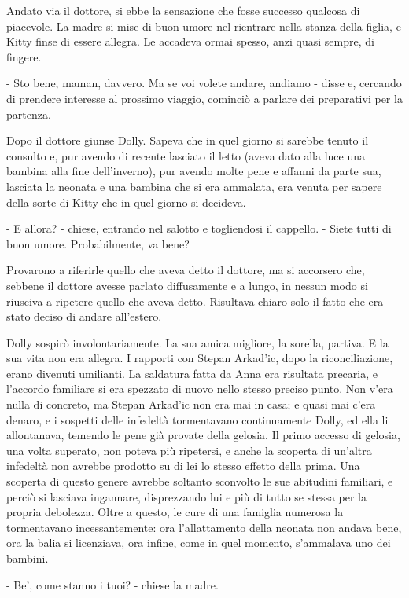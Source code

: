 Andato via il dottore, si ebbe la sensazione che fosse successo qualcosa di piacevole. La madre si mise di buon umore nel rientrare nella stanza della figlia, e Kitty finse di essere allegra. Le accadeva ormai spesso, anzi quasi sempre, di fingere. 

- Sto bene, maman, davvero. Ma se voi volete andare, andiamo - disse e, cercando di prendere interesse al prossimo viaggio, cominciò a parlare dei preparativi per la partenza. 

Dopo il dottore giunse Dolly. Sapeva che in quel giorno si sarebbe tenuto il consulto e, pur avendo di recente lasciato il letto (aveva dato alla luce una bambina alla fine dell'inverno), pur avendo molte pene e affanni da parte sua, lasciata la neonata e una bambina che si era ammalata, era venuta per sapere della sorte di Kitty che in quel giorno si decideva. 

- E allora? - chiese, entrando nel salotto e togliendosi il cappello. - Siete tutti di buon umore. Probabilmente, va bene? 

Provarono a riferirle quello che aveva detto il dottore, ma si accorsero che, sebbene il dottore avesse parlato diffusamente e a lungo, in nessun modo si riusciva a ripetere quello che aveva detto. Risultava chiaro solo il fatto che era stato deciso di andare all'estero. 

Dolly sospirò involontariamente. La sua amica migliore, la sorella, partiva. E la sua vita non era allegra. I rapporti con Stepan Arkad'ic, dopo la riconciliazione, erano divenuti umilianti. La saldatura fatta da Anna era risultata precaria, e l'accordo familiare si era spezzato di nuovo nello stesso preciso punto. Non v'era nulla di concreto, ma Stepan Arkad'ic non era mai in casa; e quasi mai c'era denaro, e i sospetti delle infedeltà tormentavano continuamente Dolly, ed ella li allontanava, temendo le pene già provate della gelosia. Il primo accesso di gelosia, una volta superato, non poteva più ripetersi, e anche la scoperta di un'altra infedeltà non avrebbe prodotto su di lei lo stesso effetto della prima. Una scoperta di questo genere avrebbe soltanto sconvolto le sue abitudini familiari, e perciò si lasciava ingannare, disprezzando lui e più di tutto se stessa per la propria debolezza. Oltre a questo, le cure di una famiglia numerosa la tormentavano incessantemente: ora l'allattamento della neonata non andava bene, ora la balia si licenziava, ora infine, come in quel momento, s'ammalava uno dei bambini. 

- Be', come stanno i tuoi? - chiese la madre. 

